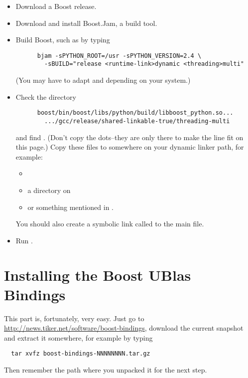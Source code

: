 \begin{itemize}
  \item Download a Boost release.
  \item Download and install Boost.Jam, a build tool.
  \item Build Boost, such as by typing
    \begin{verbatim}
      bjam -sPYTHON_ROOT=/usr -sPYTHON_VERSION=2.4 \
        -sBUILD="release <runtime-link>dynamic <threading>multi"
    \end{verbatim}

    (You may have to adapt  and
     depending on your system.)
  \item Check the directory 
    \begin{verbatim}
      boost/bin/boost/libs/python/build/libboost_python.so...
        .../gcc/release/shared-linkable-true/threading-multi
    \end{verbatim}
    and find . (Don't copy the dots--they are only
    there to make the line fit on this page.) Copy these files to somewhere
    on your dynamic linker path, for example:
    \begin{itemize}
    \item {}
    \item a directory on 
    \item or something mentioned in .
    \end{itemize}
    You should also create a symbolic link called 
    to the main \file{.so} file.

  \item Run .
\end{itemize}

\section{Installing the Boost UBlas Bindings}

\label{sec:install-bindings}
This part is, fortunately, very easy. Just go to \url{http://news.tiker.net/software/boost-bindings},
download the current snapshot and extract it somewhere, for example by typing
\begin{verbatim}
  tar xvfz boost-bindings-NNNNNNNN.tar.gz
\end{verbatim}
Then remember the path where you unpacked it for the next step.

